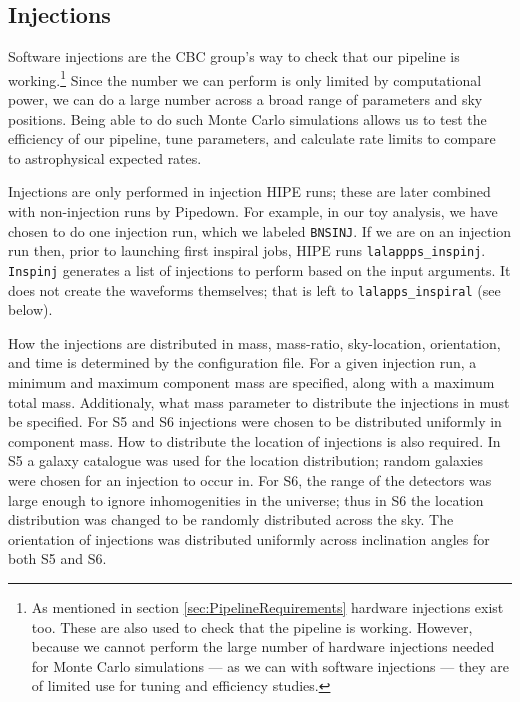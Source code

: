 \subsection{Injections}
\label{sec:inspinj}

Software injections are the \ac{CBC} group's way to check that our pipeline is working.\footnote{As mentioned in section \ref{sec:PipelineRequirements} hardware injections exist too. These are also used to check that the pipeline is working. However, because we cannot perform the large number of hardware injections needed for Monte Carlo simulations --- as we can with software injections --- they are of limited use for tuning and efficiency studies.} Since the number we can perform is only limited by computational power, we can do a large number across a broad range of parameters and sky positions. Being able to do such Monte Carlo simulations allows us to test the efficiency of our pipeline, tune parameters, and calculate rate limits to compare to astrophysical expected rates.

Injections are only performed in injection \ac{HIPE} runs; these are later combined with non-injection runs by Pipedown. For example, in our toy analysis, we have chosen to do one injection run, which we labeled \texttt{BNSINJ}. If we are on an injection run then, prior to launching first inspiral jobs, \ac{HIPE} runs \texttt{lalappps\_inspinj}. \texttt{Inspinj} generates a list of injections to perform based on the input arguments. It does not create the waveforms themselves; that is left to \texttt{lalapps\_inspiral} (see below).

How the injections are distributed in mass, mass-ratio, sky-location, orientation, and time is determined by the configuration file. For a given injection run, a minimum and maximum component mass are specified, along with a maximum total mass. Additionaly, what mass parameter to distribute the injections in must be specified. For \ac{S5} and \ac{S6} injections were chosen to be distributed uniformly in component mass. How to distribute the location of injections is also required. In \ac{S5} a galaxy catalogue was used for the location distribution; random galaxies were chosen for an injection to occur in. For \ac{S6}, the range of the detectors was large enough to ignore inhomogenities in the universe; thus in \ac{S6} the location distribution was changed to be randomly distributed across the sky. The orientation of injections was distributed uniformly across inclination angles for both \ac{S5} and \ac{S6}.

